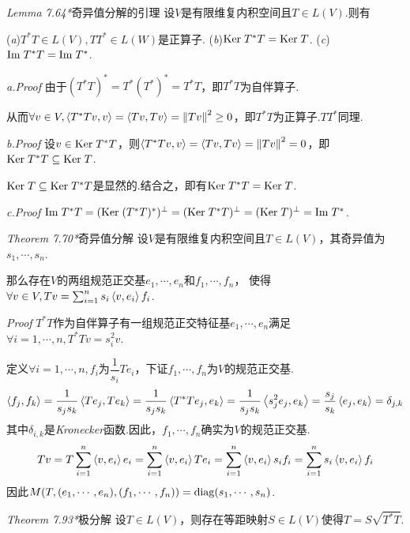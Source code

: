 \textit{Lemma 7.64*}{\kaishu 奇异值分解的引理}
设\(V\)是有限维复内积空间且\(T \in L(V)\).则有

(\textit{a})\(T^*T \in L(V),TT^* \in L(W)\)是正算子. \quad
(\textit{b})\(\mathrm{Ker \;} T^*T=\mathrm{Ker \;} T\). \quad 
(\textit{c})\(\mathrm{Im \;} T^*T=\mathrm{Im \;} T^*\).

\textit{a.Proof}
由于\((T^*T)^*=T^*(T^*)^*=T^*T\)，即\(T^*T\)为自伴算子.

从而\(\forall v \in V,\left\langle T^*Tv,v \right\rangle=\left\langle Tv,Tv \right\rangle=\left\lVert Tv \right\rVert^2 \geq 0\)，即\(T^*T\)为正算子.\(TT^*\)同理.

\textit{b.Proof}
设\(v \in \mathrm{Ker \;} T^*T\)，则\(\left\langle T^*Tv,v \right\rangle=\left\langle Tv,Tv \right\rangle=\left\lVert Tv \right\rVert^2=0\)，即\(\mathrm{Ker \;} T^*T \subseteq \mathrm{Ker \;} T\).

\(\mathrm{Ker \;} T \subseteq \mathrm{Ker \;} T^*T\)是显然的.结合之，即有\(\mathrm{Ker \;} T^*T=\mathrm{Ker \;} T\).

\textit{c.Proof}
\(\mathrm{Im \;} T^*T=(\mathrm{Ker \;} (T^*T)^*)^\bot=(\mathrm{Ker \;} T^*T)^\bot=(\mathrm{Ker \;} T)^\bot=\mathrm{Im \;} T^*\).

\hspace*{\fill}

\textit{Theorem 7.70*}{\kaishu 奇异值分解}
设\(V\)是有限维复内积空间且\(T \in L(V)\)，其奇异值为\(s_1,\cdots,s_n\).

那么存在\(V\)的两组规范正交基\(e_1,\cdots,e_n\)和\(f_1,\cdots,f_n\)，
使得\(\forall v \in V,Tv=\sum_{i=1}^n s_i\left\langle v,e_i \right\rangle f_i\).

\textit{Proof}
\(T^*T\)作为自伴算子有一组规范正交特征基\(e_1,\cdots,e_n\)满足\(\forall i=1,\cdots,n,T^*Tv=s_i^2 v\).

定义\(\forall i=1,\cdots,n,f_i\)为\(\dfrac{1}{s_i}Te_i\)，下证\(f_1,\cdots,f_n\)为\(V\)的规范正交基.
    \begin{align*}
        \left\langle f_j,f_k \right\rangle=\dfrac{1}{s_js_k}\left\langle Te_j,Te_k \right\rangle=\dfrac{1}{s_js_k}\left\langle T^*Te_j,e_k \right\rangle
        =\dfrac{1}{s_js_k}\left\langle s_j^2 e_j,e_k \right\rangle=\dfrac{s_j}{s_k}\left\langle e_j,e_k \right\rangle=\delta_{j,k}
    \end{align*}
其中\(\delta_{i,k}\)是\textit{Kronecker}函数.因此，\(f_1,\cdots,f_n\)确实为\(V\)的规范正交基.
    \begin{align*}
        Tv=T\sum_{i=1}^n \left\langle v,e_i \right\rangle e_i=\sum_{i=1}^n \left\langle v,e_i \right\rangle Te_i
        =\sum_{i=1}^n \left\langle v,e_i \right\rangle s_if_i=\sum_{i=1}^n s_i\left\langle v,e_i \right\rangle f_i
    \end{align*}
因此\(M(T,(e_1,\cdots,e_n),(f_1,\cdots,f_n))=\mathrm{diag}(s_1,\cdots,s_n)\).

\hspace*{\fill}

\textit{Theorem 7.93*}{\kaishu 极分解}
设\(T \in L(V)\)，则存在等距映射\(S \in L(V)\)使得\(T=S\sqrt{T^*T}\).

